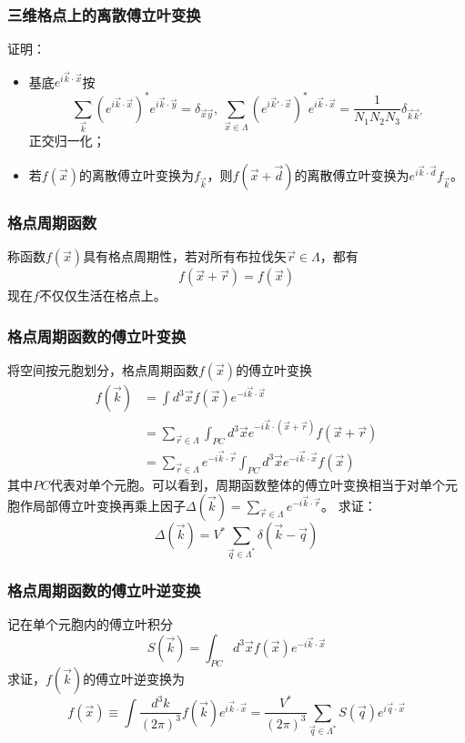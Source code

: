 \documentclass[CJK]{beamer}
\begin{document}
\begin{frame}
\frametitle{\bch 三维格点上的离散傅立叶变换 \ech}
\bch
证明：
\begin{itemize}
\item 基底$e^{i\vec k \cdot \vec x}$按
$$
\sum_{\vec{k}} (e^{i\vec k \cdot \vec x})^* e^{i\vec k \cdot \vec y} = \delta_{\vec x \vec y},\ \sum_{\vec x \in \Lambda} (e^{i\vec{k}'\cdot \vec x})^* e^{i \vec k \cdot \vec x} = \frac{1}{N_1 N_2 N_3} \delta_{\vec k \vec{k}'}
$$
正交归一化；
\item 若$f(\vec x)$的离散傅立叶变换为$f_{\vec k}$，则$f(\vec x + \vec d)$的离散傅立叶变换为$e^{i\vec k \cdot \vec d} f_{\vec k}$。 
\end{itemize}
\ech
\end{frame}

\begin{frame}
\frametitle{\bch 格点周期函数 \ech}
\bch
称函数$f(\vec x)$具有格点周期性，若对所有布拉伐矢$\vec r \in \Lambda$，都有
$$
f(\vec x + \vec r) = f(\vec x)
$$
现在$f$不仅仅生活在格点上。

\ech
\end{frame}


\begin{frame}
\frametitle{\bch 格点周期函数的傅立叶变换 \ech}
\bch
将空间按元胞划分，格点周期函数$f(\vec x)$的傅立叶变换
$$
\begin{aligned}
f(\vec k) &= \int d^3 \vec x f(\vec x) e^{-i\vec k \cdot \vec x} \\
&= \sum_{\vec r \in \Lambda} \int_{PC} d^3 \vec x e^{-i\vec k \cdot (\vec x + \vec r)} f(\vec x + \vec r) \\
&= \sum_{\vec r \in \Lambda} e^{-i\vec k \cdot \vec r} \int_{PC} d^3 \vec x e^{-i\vec k \cdot \vec x} f(\vec x)
\end{aligned}
$$
其中$PC$代表对单个元胞。可以看到，周期函数整体的傅立叶变换相当于对单个元胞作局部傅立叶变换再乘上因子$\varDelta (\vec k) = \sum_{\vec r \in \Lambda} e^{-i\vec k \cdot \vec r}
$。
求证：$$\varDelta(\vec k) = V^* \sum_{\vec q \in \Lambda^*} \delta(\vec k - \vec q)$$
\ech
\end{frame}

\begin{frame}
\frametitle{\bch 格点周期函数的傅立叶逆变换 \ech}
\bch
记在单个元胞内的傅立叶积分
$$
S(\vec k ) = \int_{PC} d^3 \vec x f(\vec x) e^{-i \vec k \cdot \vec x}
$$
求证，$f(\vec k)$的傅立叶逆变换为
$$
f(\vec x) \equiv \int \frac{d^3 k}{(2\pi)^3} f(\vec k) e^{i\vec k \cdot \vec x} = \frac{V^*}{(2\pi)^3} \sum_{\vec q \in \Lambda^*} S(\vec q)e^{i\vec q \cdot \vec x}
$$
\ech
\end{frame}
\end{document}
